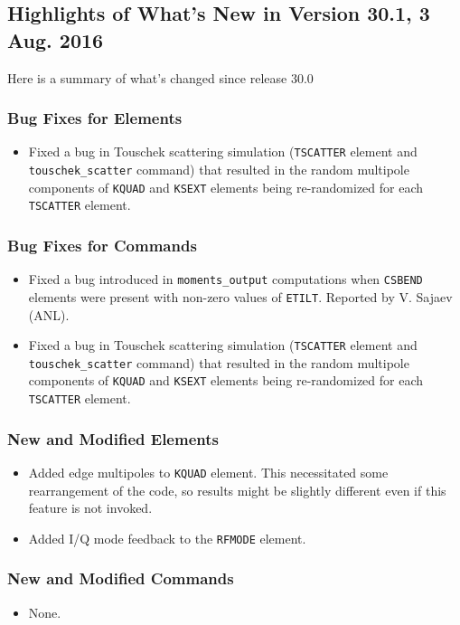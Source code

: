 \documentclass[11pt]{article}
\begin{document}
\subsection{Highlights of What's New in Version 30.1, 3 Aug. 2016}

Here is a summary of what's changed since release 30.0

\subsubsection{Bug Fixes for Elements}

\begin{itemize}
\item Fixed a bug in Touschek scattering simulation (\verb|TSCATTER| element and \verb|touschek_scatter| command) that resulted
  in the random multipole components of \verb|KQUAD| and \verb|KSEXT| elements being re-randomized for each \verb|TSCATTER| element.
\end{itemize}

\subsubsection{Bug Fixes for Commands}
\begin{itemize}
\item Fixed a bug introduced in \verb|moments_output| computations when \verb|CSBEND| elements were present 
  with non-zero values of \verb|ETILT|. Reported by V. Sajaev (ANL).
\item Fixed a bug in Touschek scattering simulation (\verb|TSCATTER| element and \verb|touschek_scatter| command) that resulted
  in the random multipole components of \verb|KQUAD| and \verb|KSEXT| elements being re-randomized for each \verb|TSCATTER| element.
\end{itemize}

\subsubsection{New and Modified Elements}
\begin{itemize}
\item Added edge multipoles to \verb|KQUAD| element. This necessitated some rearrangement of the code, so results might be
  slightly different even if this feature is not invoked.
\item Added I/Q mode feedback to the \verb|RFMODE| element.
\end{itemize}

\subsubsection{New and Modified Commands}
\begin{itemize}
\item None.
\end{itemize}
\end{document}
